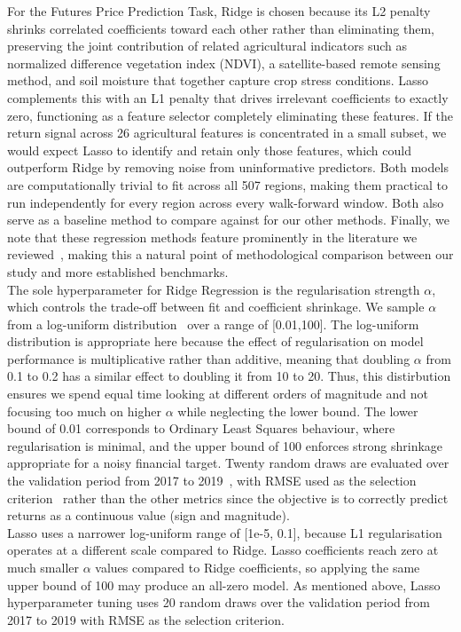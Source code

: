 \documentclass[pdflatex,sn-mathphys-num, oneside, 11pt]{sn-jnl}%
\theoremstyle{thmstyleone}%
\theoremstyle{thmstyletwo}%
\theoremstyle{thmstylethree}%
\begin{document}
For the Futures Price Prediction Task, Ridge is chosen because its L2 penalty shrinks correlated coefficients toward each other rather than eliminating them, preserving the joint contribution of related agricultural indicators such as normalized difference vegetation index (NDVI), a satellite-based remote sensing method, and soil moisture that together capture crop stress conditions. Lasso complements this with an L1 penalty that drives irrelevant coefficients to exactly zero, functioning as a feature selector completely eliminating these features. If the return signal across 26 agricultural features is concentrated in a small subset, we would expect Lasso to identify and retain only those features, which could outperform Ridge by removing noise from uninformative predictors. Both models are computationally trivial to fit across all 507 regions, making them practical to run independently for every region across every walk-forward window. Both also serve as a baseline method to compare against for our other methods. Finally, we note that these regression methods feature prominently in the literature we reviewed~\cite{bib14,bib16}, making this a natural point of methodological comparison between our study and more established benchmarks.\\

The sole hyperparameter for Ridge Regression is the regularisation strength $\alpha$, which controls the trade-off between fit and coefficient shrinkage. We sample $\alpha$ from a log-uniform distribution~\cite{bib33} over a range of [0.01,100]. The log-uniform distribution is appropriate here because the effect of regularisation on model performance is multiplicative rather than additive, meaning that doubling $\alpha$ from 0.1 to 0.2 has a similar effect to doubling it from 10 to 20. Thus, this distirbution ensures we spend equal time looking at different orders of magnitude and not focusing too much on higher $\alpha$ while neglecting the lower bound. The lower bound of 0.01 corresponds to Ordinary Least Squares behaviour, where regularisation is minimal, and the upper bound of 100 enforces strong shrinkage appropriate for a noisy financial target. Twenty random draws are evaluated over the validation period from 2017 to 2019~\cite{bib33}, with RMSE used as the selection criterion~\cite{bib35} rather than the other metrics since the objective is to correctly predict returns as a continuous value (sign and magnitude).\\

Lasso uses a narrower log-uniform range of [1e-5, 0.1], because L1 regularisation operates at a different scale compared to Ridge. Lasso coefficients reach zero at much smaller $\alpha$ values compared to Ridge coefficients, so applying the same upper bound of 100 may produce an all-zero model. As mentioned above, Lasso hyperparameter tuning uses 20 random draws over the validation period from 2017 to 2019 with RMSE as the selection criterion.\\ 
\end{document}
